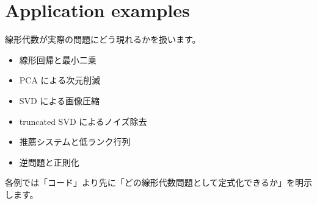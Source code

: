 \documentclass[
  11pt,
  a4paper,
]{ltjsarticle}
\author{}
\date{}
\providecommand{\tightlist}{%
  \setlength{\itemsep}{0pt}\setlength{\parskip}{0pt}}
\begin{document}
\hypertarget{application-examples}{%
\section{Application examples}\label{application-examples}}

線形代数が実際の問題にどう現れるかを扱います。

\begin{itemize}
\tightlist
\item
  線形回帰と最小二乗
\item
  PCA による次元削減
\item
  SVD による画像圧縮
\item
  truncated SVD によるノイズ除去
\item
  推薦システムと低ランク行列
\item
  逆問題と正則化
\end{itemize}

各例では「コード」より先に「どの線形代数問題として定式化できるか」を明示します。
\end{document}
